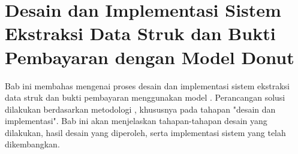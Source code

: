 \chapter{Desain dan Implementasi Sistem Ekstraksi Data Struk dan Bukti Pembayaran dengan Model Donut}
\label{chapter:desain-implementasi}
Bab ini membahas mengenai proses desain dan implementasi sistem ekstraksi data struk dan bukti pembayaran menggunakan model \donut. Perancangan solusi dilakukan berdasarkan metodologi \dsrm, khususnya pada tahapan "desain dan implementasi". Bab ini akan menjelaskan tahapan-tahapan desain yang dilakukan, hasil desain yang diperoleh, serta implementasi sistem yang telah dikembangkan.





